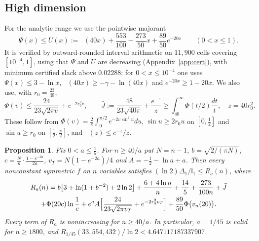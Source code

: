 \documentclass[11pt]{amsart}
\newtheorem{proposition}[theorem]{Proposition}
\theoremstyle{definition}
\theoremstyle{remark}
\newcommand{\I}{\mathsf I}
\DeclareMathOperator{\Ei}{E_1}
\begin{document}
\subsection{High dimension}
For the analytic range we use the pointwise majorant
\begin{equation}\label{eq:majorant}
 \Psi(x)\le U(x):=\Ei(40x)+\frac{553}{100}-\frac{273}{50}x+\frac{89}{50}e^{-20x}\qquad(0<x\le1).
\end{equation}
It is verified by outward-rounded interval arithmetic on $11{,}900$ cells covering $[10^{-4},1]$, using that $\Psi$ and $U$ are decreasing (Appendix~\ref{app:cert}), with minimum certified slack above $0.02288$; for $0<x\le10^{-4}$ one uses $\Psi(x)\le3-\ln x$, $\Ei(40x)\ge-\gamma-\ln(40x)$ and $e^{-20x}\ge1-20x$. We also use, with $r_0=\frac{23}{48}$,
\begin{equation}\label{eq:Phibound}
 \Phi(v)\le\frac{24}{23\sqrt{2\pi v}}+e^{-2r_0^2v},\qquad
 \bar J:=\frac{48}{23\sqrt{40\pi}}+\frac{e^{-z}}z\ge\int_{40}^\infty\Phi(t/2)\frac{dt}t,\quad z=40r_0^2.
\end{equation}
These follow from $\Phi(v)=\frac2\pi\int_0^{\pi/2}e^{-2v\sin^2u}du$, $\sin u\ge2r_0u$ on $[0,\frac12]$ and $\sin u\ge r_0$ on $[\frac12,\frac\pi2]$, and $\Ei(z)\le e^{-z}/z$.

\begin{proposition}\label{prop:large}
Fix $0<a\le\frac15$. For $n\ge40/a$ put $N=n-1$, $b=\sqrt{2/(\pi N)}$, $c=\frac Nn\cdot\frac{1-e^{-2a}}{2a}$, $v_T=N(1-e^{-2a})/4$ and $A=-\frac12-\ln a+a$. Then every nonconstant symmetric $f$ on $n$ variables satisfies $(\ln2)\Delta_1/\I_1\le R_a(n)$, where
\begin{multline*}
 R_a(n)=b\bigl[3+\ln(1+b^{-2})+2\ln2\bigr]+\frac{6+4\ln n}{n}+\frac{14}5+\frac{273}{100n}+\bar J\\
 +\Phi(20c)\ln\frac1c+e^aA\Bigl[\frac{24}{23\sqrt{2\pi v_T}}+e^{-2r_0^2v_T}\Bigr]+\frac{89}{50}\Phi\bigl(v_n(20)\bigr).
\end{multline*}
Every term of $R_a$ is nonincreasing for $n\ge40/a$. In particular, $a=1/45$ is valid for $n\ge1800$, and $R_{1/45}(33{,}554{,}432)/\ln2<4.647117187337907$.
\end{proposition}
\end{document}
